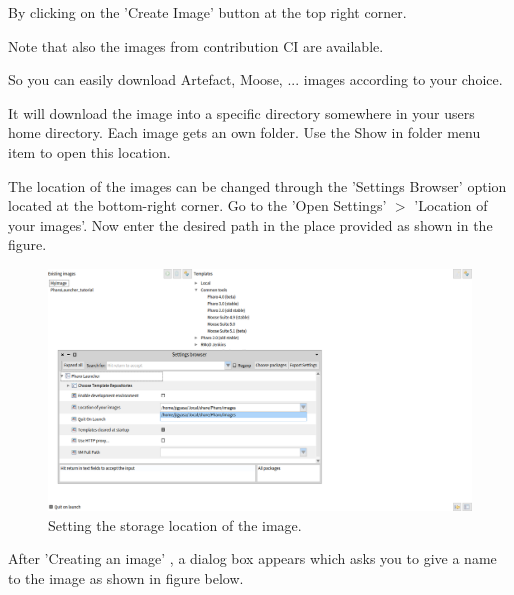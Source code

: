 \documentclass[a4paper,10pt,twoside]{book}
\begin{document}
By clicking on the 'Create Image' button at the top right corner.

Note that also the images from contribution CI are available.

So you can easily download Artefact, Moose, ... images according to your choice.

It will download the image into a specific directory somewhere in your users home directory.
Each image gets an own folder. Use the Show in folder menu item  to open this location.

The location of the images can be changed through the 'Settings Browser' option located at the bottom-right corner.
Go to the 'Open Settings' $>$ 'Location of your images'. Now enter the desired path in the place provided as shown in the figure.


\begin{figure}

\begin{center}
\includegraphics[width=1.0\textwidth]{figures/location.png}\caption{Setting the storage location of the image.\label{settingLocation}}\end{center}
\end{figure}


After 'Creating an image' , a dialog box appears which asks you to give a name to the image as shown in figure below.
\end{document}
